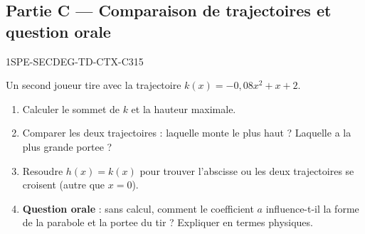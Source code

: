 \bigskip

\subsection*{Partie C — Comparaison de trajectoires et question orale}

\begin{exercice}{1SPE-SECDEG-TD-CTX-C}{3}{15}

Un second joueur tire avec la trajectoire $k(x) = -0{,}08x^2 + x + 2$.

\begin{enumerate}
  \item Calculer le sommet de $k$ et la hauteur maximale.
  \item Comparer les deux trajectoires : laquelle monte le plus haut ? Laquelle a la plus grande portee ?
  \item Resoudre $h(x) = k(x)$ pour trouver l'abscisse ou les deux trajectoires se croisent (autre que $x = 0$).
  \item \textbf{Question orale} : sans calcul, comment le coefficient $a$ influence-t-il la forme de la parabole et la portee du tir ? Expliquer en termes physiques.
\end{enumerate}
\end{exercice}


